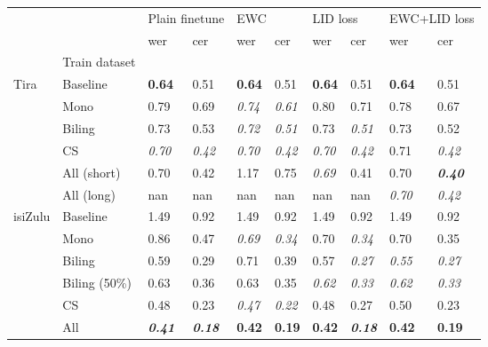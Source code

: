 \begin{tabular}{llllllllll}
\toprule
 &  & \multicolumn{2}{l}{Plain finetune} & \multicolumn{2}{l}{EWC} & \multicolumn{2}{l}{LID loss} & \multicolumn{2}{l}{EWC+LID loss} \\
 &  & wer & cer & wer & cer & wer & cer & wer & cer \\
 & Train dataset &  &  &  &  &  &  &  &  \\
\midrule
Tira & Baseline & \textbf{0.64} & 0.51 & \textbf{0.64} & 0.51 & \textbf{0.64} & 0.51 & \textbf{0.64} & 0.51 \\
 & Mono & 0.79 & 0.69 & \textit{0.74} & \textit{0.61} & 0.80 & 0.71 & 0.78 & 0.67 \\
 & Biling & 0.73 & 0.53 & \textit{0.72} & \textit{0.51} & 0.73 & \textit{0.51} & 0.73 & 0.52 \\
 & CS & \textit{0.70} & \textit{0.42} & \textit{0.70} & \textit{0.42} & \textit{0.70} & \textit{0.42} & 0.71 & \textit{0.42} \\
 & All (short) & 0.70 & 0.42 & 1.17 & 0.75 & \textit{0.69} & 0.41 & 0.70 & \textit{\textbf{0.40}} \\
 & All (long) & nan & nan & nan & nan & nan & nan & \textit{0.70} & \textit{0.42} \\
\midrule
isiZulu & Baseline & 1.49 & 0.92 & 1.49 & 0.92 & 1.49 & 0.92 & 1.49 & 0.92 \\
 & Mono & 0.86 & 0.47 & \textit{0.69} & \textit{0.34} & 0.70 & \textit{0.34} & 0.70 & 0.35 \\
 & Biling & 0.59 & 0.29 & 0.71 & 0.39 & 0.57 & \textit{0.27} & \textit{0.55} & \textit{0.27} \\
 & Biling (50\%) & 0.63 & 0.36 & 0.63 & 0.35 & \textit{0.62} & \textit{0.33} & \textit{0.62} & \textit{0.33} \\
 & CS & 0.48 & 0.23 & \textit{0.47} & \textit{0.22} & 0.48 & 0.27 & 0.50 & 0.23 \\
 & All & \textit{\textbf{0.41}} & \textit{\textbf{0.18}} & \textbf{0.42} & \textbf{0.19} & \textbf{0.42} & \textit{\textbf{0.18}} & \textbf{0.42} & \textbf{0.19} \\
\bottomrule
\end{tabular}
